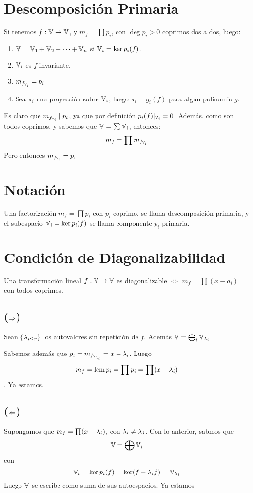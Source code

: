 \documentclass{article}
\begin{document}
\section*{Descomposición Primaria}
Si tenemos $f : \mathbb{V} \to \mathbb{V}$, y $m_f = \prod p_i$, con $\deg p_i > 0$ coprimos dos a dos, luego:
\begin{enumerate}
	\item $\mathbb{V} = \mathbb{V}_1 + \mathbb{V}_2 + \dots + \mathbb{V}_n$ si $\mathbb{V}_i = \ker p_i(f)$.
	\item $\mathbb{V}_i$ es $f$ invariante.
	\item $m_{f_{\mathbb{V}_i}} = p_i$
	\item Sea $\pi_i$ una proyección sobre $\mathbb{V}_i$, luego $\pi_i = g_i(f)$ para algún polinomio $g$.
\end{enumerate}

Es claro que $m_{f_{\mathbb{V}_i}} \mid p_i$, ya que por definición $p_i(f)|_{\mathbb{V}_i} = 0$. Además, como son todos coprimos, y sabemos que $\mathbb{V} = \sum \mathbb{V}_i$, entonces:
\[
	m_f = \prod m_{f_{\mathbb{V}_i}}
\]
Pero entonces $m_{f_{\mathbb{V}_i}} = p_i$

\section*{Notación}
Una factorización $m_f = \prod p_i$ con $p_i$ coprimo, se llama descomposición primaria, y el subespacio $\mathbb{V}_i = \ker p_i(f)$ se llama componente $p_i$-primaria.

\section*{Condición de Diagonalizabilidad}
Una transformación lineal $f : \mathbb{V} \to \mathbb{V}$ es diagonalizable $\iff$ $m_f = \prod (x-a_i)$ con todos coprimos.

\subsection*{($\Rightarrow$)}
Sean $\{\lambda_{i \leq r}\}$ los autovalores sin repetición de $f$. Además $\mathbb{V} = \bigoplus_i \mathbb{V}_{\lambda_i}$

Sabemos además que $p_i = m_{f_{\mathbb{V}_{\lambda_i}}} = x - \lambda_i$. Luego
\[m_f = \operatorname{lcm} p_i = \prod p_i = \prod (x - \lambda_i)\].
Ya estamos.

\subsection*{($\Leftarrow$)}
Supongamos que $m_f = \prod (x - \lambda_i)$, con $\lambda_i \neq \lambda_j$. Con lo anterior, sabmos que \[\mathbb{V} = \bigoplus \mathbb{V}_i\] con
\[\mathbb{V}_i = \ker p_i(f) = \ker (f - \lambda_if) = \mathbb{V}_{\lambda_i}\]
Luego $\mathbb{V}$ se escribe como suma de sus autoespacios. Ya estamos.
\end{document}
